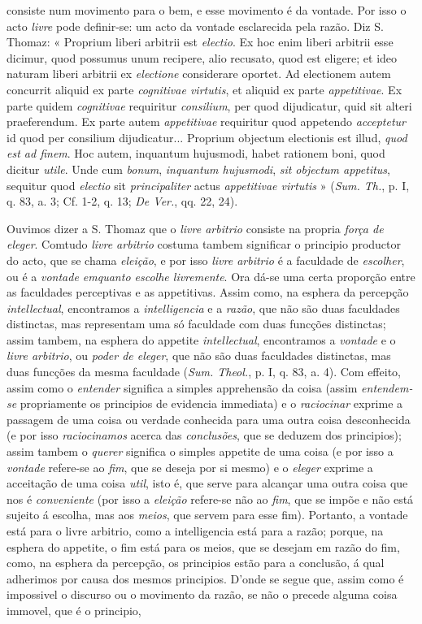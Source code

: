 consiste num movimento para o bem, e esse movimento é da vontade. Por isso o acto \emph{livre} pode definir-se: um acto da vontade esclarecida pela razão. Diz S. Thomaz: « Proprium liberi arbitrii est \emph{electio}. Ex hoc enim liberi arbitrii esse dicimur, quod possumus unum recipere, alio recusato, quod est eligere; et ideo naturam liberi arbitrii ex \emph{electione} considerare oportet. Ad electionem autem concurrit aliquid ex parte \emph{cognitivae virtutis}, et aliquid ex parte \emph{appetitivae}. Ex parte quidem \emph{cognitivae} requiritur \emph{consilium}, per quod dijudicatur, quid sit alteri praeferendum. Ex parte autem \emph{appetitivae} requiritur quod appetendo \emph{acceptetur} id quod per consilium dijudicatur... Proprium objectum electionis est illud, \emph{quod est ad finem}. Hoc autem, inquantum hujusmodi, habet rationem boni, quod dicitur \emph{utile}. Unde cum \emph{bonum}, \emph{inquantum hujusmodi}, \emph{sit objectum appetitus}, sequitur quod \emph{electio} sit \emph{principaliter} actus \emph{appetitivae virtutis} » (\emph{Sum. Th.}, p. I, q. 83, a. 3; Cf. 1-2, q. 13; \emph{De Ver.}, qq. 22, 24).\par Ouvimos dizer a S. Thomaz que o \emph{livre arbitrio} consiste na propria \emph{força de eleger}. Comtudo \emph{livre arbitrio} costuma tambem significar o principio productor do acto, que se chama \emph{eleição}, e por isso \emph{livre arbitrio} é a faculdade de \emph{escolher}, ou é a \emph{vontade emquanto escolhe livremente}. Ora dá-se uma certa proporção entre as faculdades perceptivas e as appetitivas. Assim como, na esphera da percepção \emph{intellectual}, encontramos a \emph{intelligencia} e a \emph{razão}, que não são duas faculdades distinctas, mas representam uma só faculdade com duas funcções distinctas; assim tambem, na esphera do appetite \emph{intellectual}, encontramos a \emph{vontade} e o \emph{livre arbitrio}, ou \emph{poder de eleger}, que não são duas faculdades distinctas, mas duas funcções da mesma faculdade (\emph{Sum. Theol.}, p. I, q. 83, a. 4). Com effeito, assim como o \emph{entender} significa a simples apprehensão da coisa (assim \emph{entendem-se} propriamente os principios de evidencia immediata) e o \emph{raciocinar} exprime a passagem de uma coisa ou verdade conhecida para uma outra coisa desconhecida (e por isso \emph{raciocinamos} acerca das \emph{conclusões}, que se deduzem dos principios); assim tambem o \emph{querer} significa o simples appetite de uma coisa (e por isso a \emph{vontade} refere-se ao \emph{fim}, que se deseja por si mesmo) e o \emph{eleger} exprime a acceitação de uma coisa \emph{util}, isto é, que serve para alcançar uma outra coisa que nos é \emph{conveniente} (por isso a \emph{eleição} refere-se não ao \emph{fim}, que se impõe e não está sujeito á escolha, mas aos \emph{meios}, que servem para esse fim). Portanto, a vontade está para o livre arbitrio, como a intelligencia está para a razão; porque, na esphera do appetite, o fim está para os meios, que se desejam em razão do fim, como, na esphera da percepção, os principios estão para a conclusão, á qual adherimos por causa dos mesmos principios. D'onde se segue que, assim como é impossivel o discurso ou o movimento da razão, se não o precede alguma coisa immovel, que é o principio, 
